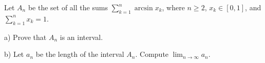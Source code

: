 Let $A_n$ be the set of all the sums $\displaystyle \sum_{k=1}^n \arcsin x_k $, where $n\geq 2$, $x_k \in [0,1]$, and $\displaystyle \sum^n_{k=1} x_k = 1$.

a) Prove that $A_n$ is an interval.

b) Let $a_n$ be the length of the interval  $A_n$. Compute $\displaystyle \lim_{n\to \infty} a_n$.